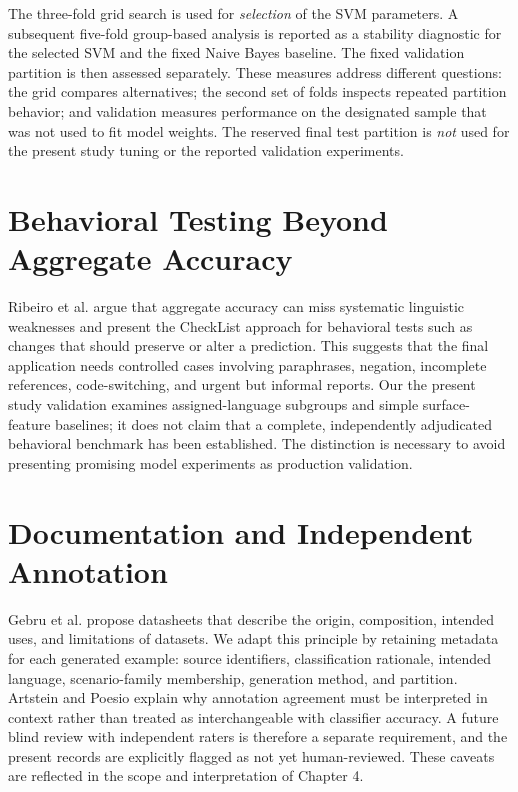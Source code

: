 The three-fold grid search is used for \emph{selection} of the SVM parameters. A subsequent five-fold group-based analysis is reported as a stability diagnostic for the selected SVM and the fixed Naive Bayes baseline. The fixed validation partition is then assessed separately. These measures address different questions: the grid compares alternatives; the second set of folds inspects repeated partition behavior; and validation measures performance on the designated sample that was not used to fit model weights. The reserved final test partition is \emph{not} used for the present study tuning or the reported validation experiments.

\section{Behavioral Testing Beyond Aggregate Accuracy}
Ribeiro et al. \cite{ribeiro} argue that aggregate accuracy can miss systematic linguistic weaknesses and present the CheckList approach for behavioral tests such as changes that should preserve or alter a prediction. This suggests that the final application needs controlled cases involving paraphrases, negation, incomplete references, code-switching, and urgent but informal reports. Our the present study validation examines assigned-language subgroups and simple surface-feature baselines; it does not claim that a complete, independently adjudicated behavioral benchmark has been established. The distinction is necessary to avoid presenting promising model experiments as production validation.

\section{Documentation and Independent Annotation}
Gebru et al. \cite{datasheets} propose datasheets that describe the origin, composition, intended uses, and limitations of datasets. We adapt this principle by retaining metadata for each generated example: source identifiers, classification rationale, intended language, scenario-family membership, generation method, and partition. Artstein and Poesio \cite{artstein} explain why annotation agreement must be interpreted in context rather than treated as interchangeable with classifier accuracy. A future blind review with independent raters is therefore a separate requirement, and the present records are explicitly flagged as not yet human-reviewed. These caveats are reflected in the scope and interpretation of Chapter 4.
